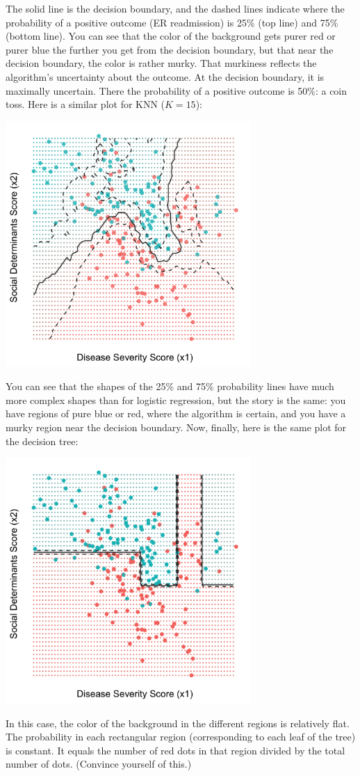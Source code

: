 The solid line is the decision boundary, and the dashed lines indicate where the probability of a positive outcome (ER readmission) is 25\% (top line) and 75\% (bottom line). You can see that the color of the background gets purer red or purer blue the further you get from the decision boundary, but that near the decision boundary, the color is rather murky. That murkiness reflects the algorithm's uncertainty about the outcome. At the decision boundary, it is maximally uncertain. There the probability of a positive outcome is 50\%: a coin toss. Here is a similar plot for KNN ($K=15$): 
\begin{center}
\includegraphics[width=0.7\textwidth]{img/esl-knn-15-prob.png}
\end{center}

You can see that the shapes of the 25\% and 75\% probability lines have much more complex shapes than for logistic regression, but the story is the same: you have regions of pure blue or red, where the algorithm is certain, and you have a murky region near the decision boundary. Now, finally, here is the same plot for the decision tree:
\begin{center}
\includegraphics[width=0.7\textwidth]{img/esl-decision-tree-prob.png}
\end{center}
In this case, the color of the background in the different regions is relatively flat. The probability in each rectangular region (corresponding to each leaf of the tree) is constant. It equals the number of red dots in that region divided by the total number of dots. (Convince yourself of this.) 
